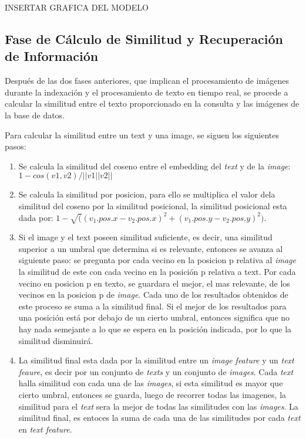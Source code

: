 INSERTAR GRAFICA DEL MODELO

\subsection*{Fase de Cálculo de Similitud y Recuperación de Información}

Después de las dos fases anteriores, que implican el procesamiento de imágenes durante la indexación y el procesamiento de texto en tiempo real, se procede a calcular la similitud entre el texto proporcionado en la consulta y las imágenes de la base de datos.

Para calcular la similitud entre un text y una image, se siguen los siguientes pasos:
\begin{enumerate}

    \item  Se calcula la similitud del coseno entre el embedding del \textit{text} y de la \textit{image}: $1- cos(v1,v2)/||v1||v2||$
    \item  Se calcula la similitud por posicion, para ello se multiplica el valor dela similitud del coseno por la similitud posicional, la similitud posicional esta dada por: $1- \sqrt((v_1.pos.x - v_2.pos.x)^2+(v_1.pos.y - v_2.pos.y)^2)$.
    \item Si el image y el text poseen similitud suficiente, es decir, una similitud superior a un umbral que determina si es relevante, entonces se avanza al siguiente paso: se pregunta por cada vecino en la posicion p relativa al \textit{image} la similitud de este con cada vecino en la posición p relativa a text. Por cada vecino en posicion p en texto, se guardara el mejor, el mas relevante, de los vecinos en la posicion p de \textit{image}. Cada uno de los resultados obtenidos de este proceso se suma a la similitud final. Si el mejor de los resultados para una posición está por debajo de un cierto umbral, entonces significa que no hay nada semejante a lo que se espera en la posición indicada, por lo que la similitud disminuirá.
    \item La similitud final esta dada por la similitud entre un \textit{image feature} y un \textit{text feaure}, es decir por un conjunto de \textit{texts} y un conjunto de \textit{images}. Cada \textit{text} halla similitud con cada una de las \textit{images}, si esta similitud es mayor que cierto umbral, entonces se guarda, luego de recorrer todas las imagenes, la similitud para el \textit{text} sera la mejor de todas las similitudes con las \textit{images}. La similitud final, es entoces la suma de cada una de las similitudes por cada \textit{text} en \textit{text feature}.
\end{enumerate}

